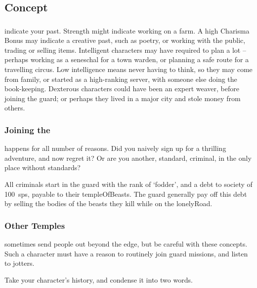 \begin{multicols}{2}
\subsection{Concept}

\subsubsection{}
indicate your past.
Strength might indicate working on a farm.
A high Charisma Bonus may indicate a creative past, such as poetry, or working with the public, trading or selling items.
Intelligent characters may have required to plan a lot -- perhaps working as a seneschal for a town \gls{warden}, or planning a safe route for a travelling circus.
Low intelligence means never having to think, so they may come from  family, or started as a high-ranking \gls{server}, with someone else doing the book-keeping.
Dexterous characters could have been an expert weaver, before joining the \gls{guard}; or perhaps they lived in a major city and stole money from others.

\subsubsection{Joining the }
happens for all number of reasons.
Did you naively sign up for a thrilling adventure, and now regret it?
Or are you another, standard, criminal, in the only place without standards?

All criminals start in the \gls{guard} with the rank of `\gls{fodder}', and a debt to society of 100~\glspl{sp}, payable to their \gls{templeOfBeasts}.
The \gls{guard} generally pay off this debt by selling the bodies of the beasts they kill while on the \gls{lonelyRoad}.

\subsubsection{Other Temples}
sometimes send people out beyond the \gls{edge}, but be careful with these concepts.
Such a character must have a reason to routinely join \gls{guard} missions, and listen to \glspl{jotter}.

Take your character's history, and condense it into two words.


\end{multicols}

